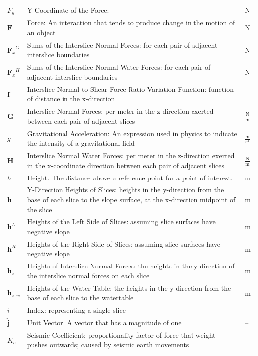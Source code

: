 \documentclass[12pt]{article}
\begin{document}
\begin{longtabu}{l X[l] l}
\\
${F_{y}}$ & Y-Coordinate of the Force:  & N
\\
$\mathbf{F}$ & Force: An interaction that tends to produce change in the motion of an object & N
\\
${{\mathbf{F}_{x}}^{G}}$ & Sums of the Interslice Normal Forces: for each pair of adjacent interslice boundaries & N
\\
${{\mathbf{F}_{x}}^{H}}$ & Sums of the Interslice Normal Water Forces: for each pair of adjacent interslice boundaries & N
\\
$\mathbf{f}$ & Interslice Normal to Shear Force Ratio Variation Function: function of distance in the x-direction & --
\\
$\mathbf{G}$ & Interslice Normal Forces: per meter in the z-direction exerted between each pair of adjacent slices & $\frac{\text{N}}{\text{m}}$
\\
$g$ & Gravitational Acceleration: An expression used in physics to indicate the intensity of a gravitational field & $\frac{\text{m}}{\text{s}^{2}}$
\\
$\mathbf{H}$ & Interslice Normal Water Forces: per meter in the z-direction exerted in the x-coordinate direction between each pair of adjacent slices & $\frac{\text{N}}{\text{m}}$
\\
$h$ & Height: The distance above a reference point for a point of interest. & m
\\
$\mathbf{h}$ & Y-Direction Heights of Slices: heights in the y-direction from the base of each slice to the slope surface, at the x-direction midpoint of the slice & m
\\
${\mathbf{h}^{L}}$ & Heights of the Left Side of Slices: assuming slice surfaces have negative slope & m
\\
${\mathbf{h}^{R}}$ & Heights of the Right Side of Slices: assuming slice surfaces have negative slope & m
\\
${\mathbf{h}_{z}}$ & Heights of Interslice Normal Forces: the heights in the y-direction of the interslice normal forces on each slice & m
\\
${\mathbf{h}_{z,w}}$ & Heights of the Water Table: the heights in the y-direction from the base of each slice to the watertable & m
\\
$i$ & Index: representing a single slice & --
\\
$\mathbf{\hat{j}}$ & Unit Vector: A vector that has a magnitude of one & --
\\
${K_{c}}$ & Seismic Coefficient: proportionality factor of force that weight pushes outwards; caused by seismic earth movements & --

\end{longtabu}
\end{document}
